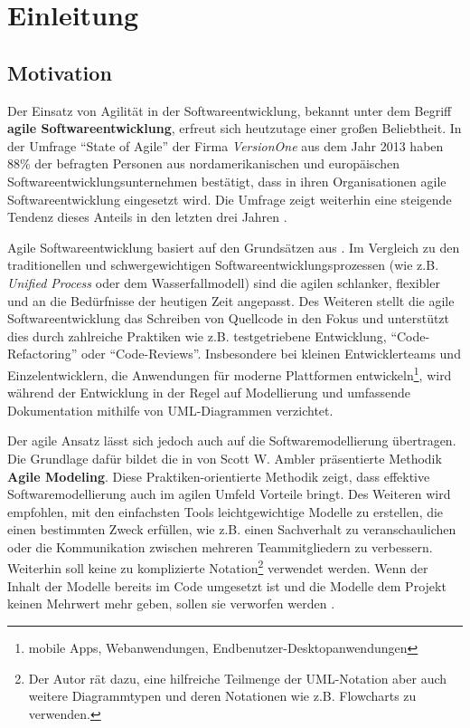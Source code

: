 
\chapter{Einleitung}
\label{chapter:introduction}

\section{Motivation}

Der Einsatz von Agilität in der Softwareentwicklung, bekannt unter dem Begriff \textbf{agile Softwareentwicklung}, erfreut sich heutzutage einer großen Beliebtheit. In der Umfrage \enquote{State of Agile} der Firma \textit{VersionOne} aus dem Jahr 2013 haben 88\% der befragten Personen aus nordamerikanischen und europäischen Softwareentwicklungsunternehmen bestätigt, dass in ihren Organisationen agile Softwareentwicklung eingesetzt wird. Die Umfrage zeigt weiterhin eine steigende Tendenz dieses Anteils in den letzten drei Jahren \cite{VersionOne148th-Annual}.

Agile Softwareentwicklung basiert auf den Grundsätzen aus \cite{BeckBeedle01Manifest}. Im Vergleich zu den traditionellen und schwergewichtigen Softwareentwicklungsprozessen (wie z.B. \textit{Unified Process} oder dem Wasserfallmodell) sind die agilen schlanker, flexibler und an die Bedürfnisse der heutigen Zeit angepasst. Des Weiteren stellt die agile Softwareentwicklung das Schreiben von Quellcode in den Fokus und unterstützt dies durch zahlreiche Praktiken wie z.B. testgetriebene Entwicklung, \enquote{Code-Refactoring} oder \enquote{Code-Reviews}. Insbesondere bei kleinen Entwicklerteams und Einzelentwicklern, die Anwendungen für moderne Plattformen entwickeln\footnote{mobile Apps, Webanwendungen, Endbenutzer-Desktopanwendungen}, wird während der Entwicklung in der Regel auf Modellierung und umfassende Dokumentation mithilfe von UML-Dia\-gram\-men verzichtet.

Der agile Ansatz lässt sich jedoch auch auf die Softwaremodellierung übertragen. Die Grundlage dafür bildet die in \cite{Ambler02Agile} von Scott W. Ambler präsentierte Methodik \textbf{Agile Modeling}. Diese Praktiken-orientierte Methodik zeigt, dass effektive Softwaremodellierung auch im agilen Umfeld Vorteile bringt. Des Weiteren wird empfohlen, mit den einfachsten Tools leichtgewichtige Modelle zu erstellen, die einen bestimmten Zweck erfüllen, wie z.B. einen Sachverhalt zu veranschaulichen oder die Kommunikation zwischen mehreren Teammitgliedern zu verbessern. Weiterhin soll keine zu komplizierte Notation\footnote{Der Autor rät dazu, eine hilfreiche Teilmenge der UML-Notation aber auch weitere Diagrammtypen und deren Notationen wie z.B. Flowcharts zu verwenden.} verwendet werden. Wenn der Inhalt der Modelle bereits im Code umgesetzt ist und die Modelle dem Projekt keinen Mehrwert mehr geben, sollen sie verworfen werden \cite{Ambler02Agile}.

